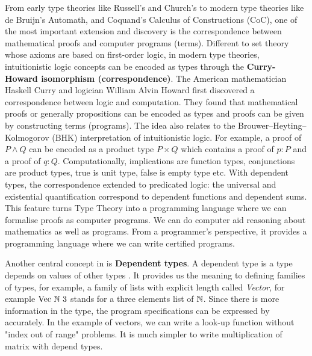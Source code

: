 From early type theories like Russell's and Church's to modern type theories like de Bruijn's Automath, \mltt and Coquand's Calculus of Constructions (CoC), one of the most important extension and discovery is the correspondence between mathematical proofs and computer programs (terms).
Different to set theory whose axioms are based on first-order logic, in modern type theories, intuitionistic logic concepts can be encoded as types through the 
\textbf{Curry-Howard isomorphism (correspondence)}.
The American mathematician Haskell Curry and logician William Alvin Howard first discovered a correspondence between logic and computation. They found that mathematical proofs or generally propositions can be encoded as types and proofs can be given by constructing terms (programs). The idea also relates to the Brouwer–Heyting–Kolmogorov (BHK) interpretation of intuitionistic logic. For example, a proof of $P \wedge Q$ can be encoded as a product type $P \times Q$ which contains a proof of $p : P$ and a proof of $q : Q$. Computationally, implications are function types, conjunctions are product types, true is unit type, false is empty type etc. 
With dependent types, the correspondence extended to predicated logic: the universal and existential quantification correspond to dependent functions and dependent sums. 
This feature turns Type Theory into a programming language where we can formalise proofs as computer programs. We can do computer aid reasoning about mathematics as well as programs. From a programmer's perspective, it provides a programming language where we can write certified programs.


Another central concept in \mltt is \textbf{Dependent types}\label{dpty}.
A dependent type is a type depends on values of other types \cite{dtw}. It provides us the meaning to defining families of types, for example, a family of lists with explicit length called \emph{Vector}, for example $\text{Vec} ~\mathbb{N} ~3$ stands for a three elements list of $\mathbb{N}$. Since there is more information in the type, the program specifications can be expressed by accurately. In the example of vectors, we can write a look-up function without "index out of range" problems. It is much simpler to write multiplication of matrix with depend types.


